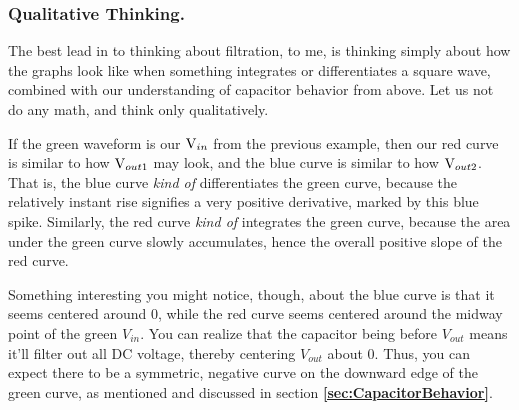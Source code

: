 \documentclass[12pt]{report}
\newcommand{\V}{{\rm V}}
\newcommand{\Vo}{{V}_{out}}
\newcommand{\Vi}{{V}_{in}}
\begin{document}
\subsubsection{Qualitative Thinking.}

The best lead in to thinking about filtration, to me, is thinking simply about how the graphs look like when something integrates or differentiates a square wave, combined with our understanding of capacitor behavior from above. Let us not do any math, and think only qualitatively.\newline 

\begin{centering}
    
\end{centering}

If the green waveform is our $\V_{in}$ from the previous example, then our red curve is similar to how $\V_{out1}$ may look, and the blue curve is similar to how $\V_{out2}$. That is, the blue curve \textit{kind of} differentiates the green curve, because the relatively instant rise signifies a very positive derivative, marked by this blue spike. Similarly, the red curve \textit{kind of} integrates the green curve, because the area under the green curve slowly accumulates, hence the overall positive slope of the red curve.\newline 

Something interesting you might notice, though, about the blue curve is that it seems centered around 0, while the red curve seems centered around the midway point of the green $\Vi$. You can realize that the capacitor being before $\Vo$ means it'll filter out all DC voltage, thereby centering $\Vo$ about 0. Thus, you can expect there to be a symmetric, negative curve on the downward edge of the green curve, as mentioned and discussed in section \textbf{\ref{sec:CapacitorBehavior}}.\newline
\end{document}

